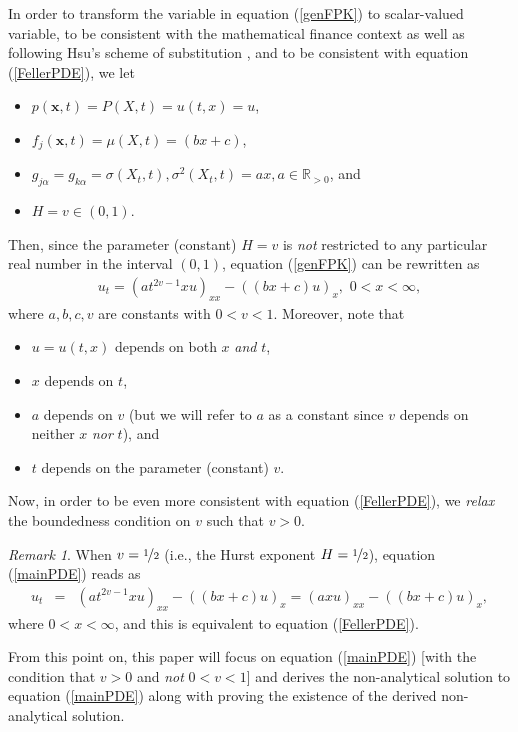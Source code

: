 \documentclass[preprint, 12pt]{elsarticle}
\numberwithin{equation}{section}
\theoremstyle{plain}
\theoremstyle{remark}
\newtheorem{remark}{Remark}[section]
\begin{document}
In order to transform the variable in equation (\ref{genFPK}) to scalar-valued variable, to be consistent with the mathematical finance context as well as following Hsu's scheme of substitution \citep{Hsu}, and to be consistent with equation (\ref{FellerPDE}), we let
\begin{itemize}
\item $p (\mathbf{x}, t) = P (X, t) = u(t,x)=u$,  
\item $f_j (\mathbf{x}, t) ={\mu} (X, t) = (bx+c)$,  
\item $g_{j \alpha} = g_{k \alpha} = \sigma (X_t, t), \sigma^2(X_t,t)=ax, a \in \mathbb{R}_{>0}$, and
\item $H=v\in(0,1)$.
\end{itemize}
Then, since the parameter (constant) $H=v$ is \emph{not} restricted to any particular real number in the interval $(0, 1)$, equation (\ref{genFPK}) can be rewritten as
\begin{eqnarray}
u_t = (a t^{2 v - 1} x u)_{x x} - ((b x + c) u)_x \label{mainPDE}, \,\, 0 < x < \infty, 
\end{eqnarray}
where $a, b, c, v$ are constants with $0 < v < 1$. Moreover, note that
\begin{itemize}
\item $u = u (t, x)$ depends on both $x$ \emph{and} $t$,  
\item $x$ depends on $t$,  
\item $a$ depends on $v$ (but we will refer to $a$ as a constant since $v$ depends on neither $x$ \emph{nor} $t$), and  
\item $t$ depends on the parameter (constant) $v$.
\end{itemize}
Now, in order to be even more consistent with equation (\ref{FellerPDE}), we {\emph{relax}} the boundedness condition on $v$ such that $v > 0$.

\begin{remark}
When $v = \nicefrac{1}{2}$ (i.e., the Hurst exponent $H = \nicefrac{1}{2}$), equation (\ref{mainPDE}) reads as
\begin{eqnarray*}
u_t & = & (a t^{2 v - 1} x u)_{x x} - ((b x + c) u)_x = (a x u)_{x x} - ((b x + c) u)_x,
\end{eqnarray*}
where $0 < x < \infty$, and this is equivalent to equation (\ref{FellerPDE}).
\end{remark}

From this point on, this paper will focus on equation (\ref{mainPDE}) [with the condition that $v>0$ and \emph{not} $0<v<1$] and derives the non-analytical solution to equation (\ref{mainPDE}) along with proving the existence of the derived non-analytical solution.
\end{document}
